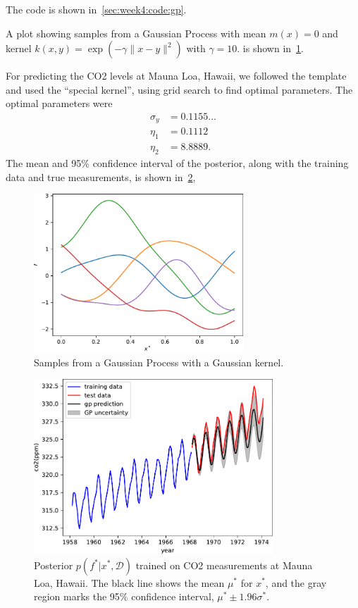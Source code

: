The code is shown in~\cref{sec:week4:code:gp}.

A plot showing samples from a Gaussian Process
with mean $m(x) = 0$ and kernel
$k(x, y) = \exp{\left( -\gamma \parallel x - y \parallel^2 \right)}$
with $\gamma = 10$.
is shown in~\cref{fig:week4:gp:gp-samples}.

For predicting the CO2 levels at Mauna Loa, Hawaii,
we followed the template and used the ``special kernel'',
using grid search to find optimal parameters.
The optimal parameters were
\begin{align*}
  \sigma_y &= 0.1155\ldots \\
  \eta_1 &= 0.1112 \\
  \eta_2 &= 8.8889.
\end{align*}
The mean and 95\% confidence interval of the posterior,
along with the training data and true measurements,
is shown in~\cref{fig:week4:gp:predict},

\begin{figure}[htbp]
  \centering
  \includegraphics[width=0.7\textwidth]{./figures/gp_samples.pdf}
  \caption{Samples from a Gaussian Process with a Gaussian kernel.}
  \label{fig:week4:gp:gp-samples}
\end{figure}

\begin{figure}[htbp]
  \centering
  \includegraphics[width=0.8\textwidth]{./figures/gp_predict.pdf}
  \caption{
    Posterior $p(f^\ast | x^\ast, \mathcal{D})$ trained on
    CO2 measurements at Mauna Loa, Hawaii.
    The black line shows the mean $\mu^\ast$ for $x^\ast$,
    and the gray region marks the 95\% confidence interval,
    $\mu^\ast \pm 1.96 \sigma^\ast$.
  }
  \label{fig:week4:gp:predict}
\end{figure}
